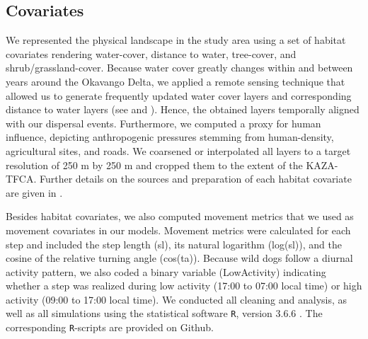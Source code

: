 \documentclass[abstract=on,10pt,a4paper,bibliography=totocnumbered]{article}
\begin{document}
\subsection{Covariates}
We represented the physical landscape in the study area using a set of habitat
covariates rendering water-cover, distance to water, tree-cover, and
shrub/grassland-cover. Because water cover greatly changes within and between
years around the Okavango Delta, we applied a remote sensing technique that
allowed us to generate frequently updated water cover layers and corresponding
distance to water layers (see \citealp{Wolski.2017} and \citealp{Hofmann.2021}).
Hence, the obtained layers temporally aligned with our dispersal events.
Furthermore, we computed a proxy for human influence, depicting anthropogenic
pressures stemming from human-density, agricultural sites, and roads. We
coarsened or interpolated all layers to a target resolution of 250 m by 250 m
and cropped them to the extent of the KAZA-TFCA. Further details on the sources
and preparation of each habitat covariate are given in \cite{Hofmann.2020}.

Besides habitat covariates, we also computed movement metrics that we used as
movement covariates in our models. Movement metrics were calculated for each
step and included the step length (\textsf{sl}), its natural logarithm
(\textsf{log(sl)}), and the cosine of the relative turning angle
(\textsf{cos(ta)}). Because wild dogs follow a diurnal activity pattern, we also
coded a binary variable (\textsf{LowActivity}) indicating whether a step was
realized during low activity (17:00 to 07:00 local time) or high activity (09:00
to 17:00 local time). We conducted all cleaning and analysis, as well as all
simulations using the statistical software {\tt R}, version 3.6.6
\citep{R.2019}. The corresponding {\tt R}-scripts are provided on Github.
\end{document}
